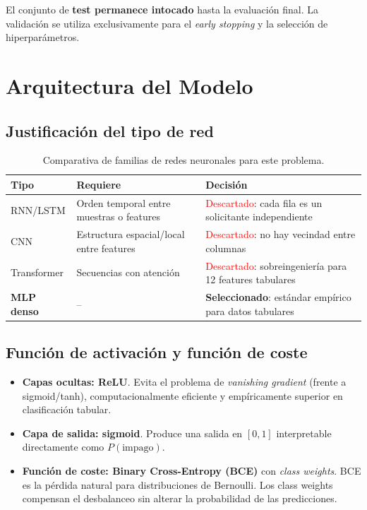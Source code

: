 \documentclass[12pt,a4paper]{article}
\begin{document}
El conjunto de \textbf{test permanece intocado} hasta la evaluación
final. La validación se utiliza exclusivamente para el \textit{early
stopping} y la selección de hiperparámetros.

\section{Arquitectura del Modelo}
\label{sec:architecture}

\subsection{Justificación del tipo de red}

\begin{table}[H]
\centering
\caption{Comparativa de familias de redes neuronales para este problema.}
\label{tab:net_types}
\small
\begin{tabularx}{\textwidth}{@{} l X X @{}}
\toprule
\textbf{Tipo} & \textbf{Requiere} & \textbf{Decisión} \\
\midrule
RNN/LSTM & Orden temporal entre muestras o features & \textcolor{red}{Descartado}: cada fila es un solicitante independiente \\
CNN & Estructura espacial/local entre features & \textcolor{red}{Descartado}: no hay vecindad entre columnas \\
Transformer & Secuencias con atención & \textcolor{red}{Descartado}: sobreingeniería para 12 features tabulares \\
\textbf{MLP denso} & -- & \textcolor{green!60!black}{\textbf{Seleccionado}}: estándar empírico para datos tabulares \\
\bottomrule
\end{tabularx}
\end{table}

\subsection{Función de activación y función de coste}

\begin{itemize}
    \item \textbf{Capas ocultas: ReLU}. Evita el problema de
          \textit{vanishing gradient} (frente a sigmoid/tanh),
          computacionalmente eficiente y empíricamente superior en
          clasificación tabular.
    \item \textbf{Capa de salida: sigmoid}. Produce una salida en $[0,1]$
          interpretable directamente como $P(\text{impago})$.
    \item \textbf{Función de coste: Binary Cross-Entropy (BCE)} con
          \textit{class weights}. BCE es la pérdida natural para
          distribuciones de Bernoulli. Los class weights compensan el
          desbalanceo sin alterar la probabilidad de las predicciones.
\end{itemize}
\end{document}
